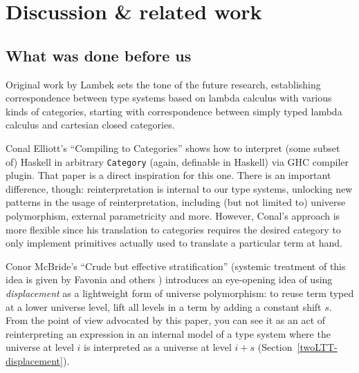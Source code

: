 \section{Discussion \& related work}

\subsection{What was done before us}

Original work by Lambek \cite{Lambek1980} sets the tone
of the future research, establishing correspondence
between type systems based on lambda calculus with
various kinds of categories, starting with
correspondence between simply typed lambda calculus and
cartesian closed categories.

Conal Elliott's ``Compiling to Categories''
\cite{Elliott:Compcat2017} shows how to interpret (some
subset of) Haskell in arbitrary \texttt{Category}
(again, definable in Haskell) via GHC compiler plugin.
That paper is a direct inspiration for this one. There
is an important difference, though: reinterpretation is
internal to our type systems, unlocking new patterns in
the usage of reinterpretation, including (but not
limited to) universe polymorphism, external
parametricity and more. However, Conal's approach is
more flexible since his translation to categories
requires the desired category to only implement primitives
actually used to translate a particular term at
hand.

Conor McBride's ``Crude but effective stratification''
\cite{McBride:Crude2011, McBride:Crude2012} (systemic
treatment of this idea is given by Favonia and others
\cite{Favonia:Displacement2023}) introduces an
eye-opening idea of using \textit{displacement} as a
lightweight form of universe polymorphism: to reuse term
typed at a lower universe level, lift all levels in a
term by adding a constant shift $s$. From the point of
view advocated by this paper, you can see it as an act
of reinterpreting an expression in an internal model of
a type system where the universe at level $i$ is interpreted
as a universe at level $i+s$
(Section~\ref{twoLTT-displacement}).

